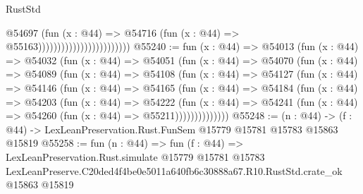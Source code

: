 \begin{lexlean}{RustStd}
\begin{coremodule}
                                              @54697
                                                (fun (x : @44) =>
                                                @54716
                                                  (fun (x : @44) => @55163))))))))))))))))))))))))
@55240 := fun (x : @44) =>
  @54013
    (fun (x : @44) =>
    @54032
      (fun (x : @44) =>
      @54051
        (fun (x : @44) =>
        @54070
          (fun (x : @44) =>
          @54089
            (fun (x : @44) =>
            @54108
              (fun (x : @44) =>
              @54127
                (fun (x : @44) =>
                @54146
                  (fun (x : @44) =>
                  @54165
                    (fun (x : @44) =>
                    @54184
                      (fun (x : @44) =>
                      @54203
                        (fun (x : @44) =>
                        @54222
                          (fun (x : @44) =>
                          @54241 (fun (x : @44) => @54260 (fun (x : @44) => @55211))))))))))))))
@55248 := (n : @44) ->
  (f : @44) -> LexLeanPreservation.Rust.FunSem @15779 @15781 @15783 @15863 @15819
@55258 := fun (n : @44) =>
  fun (f : @44) =>
  LexLeanPreservation.Rust.simulate
    @15779
    @15781
    @15783
    LexLeanPreserve.C20ded4f4be0e5011a640fb6c30888a67.R10.RustStd.crate_ok
    @15863
    @15819
\end{coremodule}
\end{lexlean}
